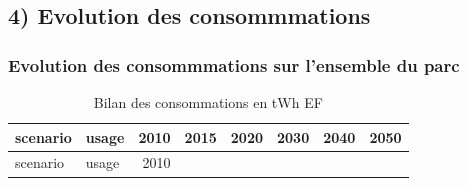 \documentclass[]{article}
\begin{document}
\clearpage
\newpage

\subsection{4) Evolution des
consommmations}\label{evolution-des-consommmations}

\subsubsection{Evolution des consommmations sur l'ensemble du
parc}\label{evolution-des-consommmations-sur-lensemble-du-parc}

\begin{longtable}[]{@{}llrrrrrr@{}}
\caption{Bilan des consommations en tWh EF}\tabularnewline
\toprule
\begin{minipage}[b]{0.14\columnwidth}\raggedright\strut
scenario\strut
\end{minipage} & \begin{minipage}[b]{0.13\columnwidth}\raggedright\strut
usage\strut
\end{minipage} & \begin{minipage}[b]{0.09\columnwidth}\raggedleft\strut
2010\strut
\end{minipage} & \begin{minipage}[b]{0.09\columnwidth}\raggedleft\strut
2015\strut
\end{minipage} & \begin{minipage}[b]{0.09\columnwidth}\raggedleft\strut
2020\strut
\end{minipage} & \begin{minipage}[b]{0.09\columnwidth}\raggedleft\strut
2030\strut
\end{minipage} & \begin{minipage}[b]{0.09\columnwidth}\raggedleft\strut
2040\strut
\end{minipage} & \begin{minipage}[b]{0.09\columnwidth}\raggedleft\strut
2050\strut
\end{minipage}\tabularnewline
\midrule
\endfirsthead
\toprule
\begin{minipage}[b]{0.14\columnwidth}\raggedright\strut
scenario\strut
\end{minipage} & \begin{minipage}[b]{0.13\columnwidth}\raggedright\strut
usage\strut
\end{minipage} & \begin{minipage}[b]{0.09\columnwidth}\raggedleft\strut
2010\strut

\end{minipage}
\end{longtable}
\end{document}
